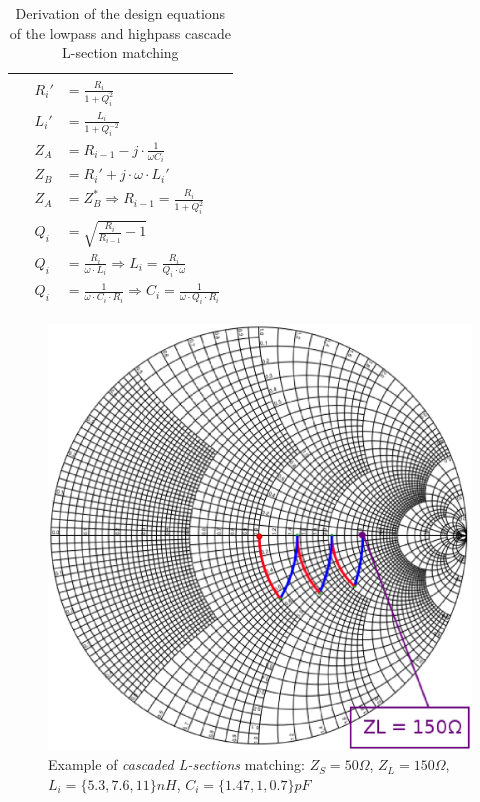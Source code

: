 \begin{table}[H]
\begin{tabular}{ | c | c | }
    &
        \begin{minipage}{.4\textwidth}
          {\begin{align}
           R_i' &= \frac{R_i}{1 + Q_i^2} \\
           L_i' &= \frac{L_i}{1 + Q_i^{-2}} \\
           Z_A &= R_{i-1} - j \cdot \frac{1}{\omega C_i} \\
           Z_B &= R_{i}' + j \cdot \omega \cdot L_i' \\
           Z_A &= Z_B^* \Longrightarrow R_{i-1} = \frac{R_i}{1 + Q_i^2} \\
           Q_{i} &= \sqrt{\frac{R_{i}}{R_{i-1}} - 1} \\
           Q_{i} &= \frac{R_{i}}{\omega \cdot L_i} \Longrightarrow L_i = \frac{R_i}{Q_i \cdot \omega}\\
           Q_{i} &= \frac{1}{\omega \cdot C_i \cdot R_{i}} \Longrightarrow C_i = \frac{1}{\omega \cdot Q_i \cdot R_i}
         \end{align}}
    \end{minipage}
    \\ \hline
  \end{tabular}
  \caption{Derivation of the design equations of the lowpass and highpass cascade L-section matching}
  \label{tbl:cascaded-l-section-lowpass-highpass}
\end{table}




\begin{figure}[H]
\centering
\includegraphics[width=120mm]{./images/Synthesis/Impedance_Matching/SmithCascadedLCsections}
\caption{Example of \textit{cascaded L-sections} matching: $Z_S = 50\Omega$, $Z_L = 150\Omega$, $L_i = \lbrace 5.3, 7.6, 11\rbrace nH$, $C_i = \lbrace 1.47, 1, 0.7 \rbrace pF$}
\end{figure}


